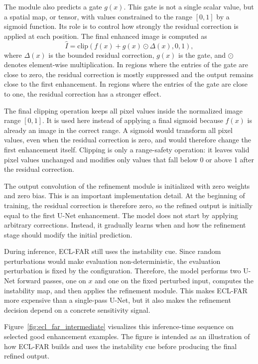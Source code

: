 The module also predicts a gate $g(x)$. This gate is not a single scalar value, but a spatial map, or tensor, with values constrained to the range $[0,1]$ by a sigmoid function. Its role is to control how strongly the residual correction is applied at each position. The final enhanced image is computed as
\begin{equation}
	\hat{I}
	=
	\mathrm{clip}
	\left(
	f(x) + g(x) \odot \Delta(x),
	0,
	1
	\right),
	\label{eq:ecl_far_refinement}
\end{equation}
where $\Delta(x)$ is the bounded residual correction, $g(x)$ is the gate, and $\odot$ denotes element-wise multiplication. In regions where the entries of the gate are close to zero, the residual correction is mostly suppressed and the output remains close to the first enhancement. In regions where the entries of the gate are close to one, the residual correction has a stronger effect.

The final clipping operation keeps all pixel values inside the normalized image range $[0,1]$. It is used here instead of applying a final sigmoid because $f(x)$ is already an image in the correct range. A sigmoid would transform all pixel values, even when the residual correction is zero, and would therefore change the first enhancement itself. Clipping is only a range-safety operation: it leaves valid pixel values unchanged and modifies only values that fall below 0 or above 1 after the residual correction.

The output convolution of the refinement module is initialized with zero weights and zero bias. This is an important implementation detail. At the beginning of training, the residual correction is therefore zero, so the refined output is initially equal to the first U-Net enhancement. The model does not start by applying arbitrary corrections. Instead, it gradually learns when and how the refinement stage should modify the initial prediction.

During inference, ECL-FAR still uses the instability cue. Since random perturbations would make evaluation non-deterministic, the evaluation perturbation is fixed by the configuration. Therefore, the model performs two U-Net forward passes, one on $x$ and one on the fixed perturbed input, computes the instability map, and then applies the refinement module. This makes ECL-FAR more expensive than a single-pass U-Net, but it also makes the refinement decision depend on a concrete sensitivity signal.

Figure~\ref{fig:ecl_far_intermediate} visualizes this inference-time sequence on selected good enhancement examples. The figure is intended as an illustration of how ECL-FAR builds and uses the instability cue before producing the final refined output.

